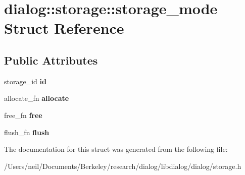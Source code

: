 \hypertarget{structdialog_1_1storage_1_1storage__mode}{}\section{dialog\+:\+:storage\+:\+:storage\+\_\+mode Struct Reference}
\label{structdialog_1_1storage_1_1storage__mode}
\subsection*{Public Attributes}
\begin{DoxyCompactItemize}
\item 
\mbox{\label{structdialog_1_1storage_1_1storage__mode_a0c0418906c2aa3c4ce9db2050d2862bd}} 
storage\+\_\+id {\bfseries id}
\item 
\mbox{\label{structdialog_1_1storage_1_1storage__mode_a1839c2ef8a3c0bcde495429a88ccb37f}} 
allocate\+\_\+fn {\bfseries allocate}
\item 
\mbox{\label{structdialog_1_1storage_1_1storage__mode_a775c5b9b7cc86fe0ef1d9ac7a4d7a3e8}} 
free\+\_\+fn {\bfseries free}
\item 
\mbox{\label{structdialog_1_1storage_1_1storage__mode_a38b2c5069287cb4dcfa7ddcb68def4f8}} 
flush\+\_\+fn {\bfseries flush}
\end{DoxyCompactItemize}


The documentation for this struct was generated from the following file\+:\begin{DoxyCompactItemize}
\item 
/\+Users/neil/\+Documents/\+Berkeley/research/dialog/libdialog/dialog/storage.\+h\end{DoxyCompactItemize}
